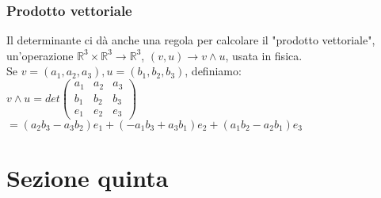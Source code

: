 \documentclass[12pt]{article}
\begin{document}
\subsubsection{Prodotto vettoriale}
Il determinante ci dà anche una regola per calcolare il "prodotto vettoriale", un'operazione
$\mathbb{R}^3\times \mathbb{R}^3 \longrightarrow \mathbb{R}^3$, $(v,u) \longrightarrow v \wedge u $, usata in fisica.\\
Se $v= (a_1, a_2, a_3) , u=(b_1, b_2, b_3)$, definiamo:\\
$v\wedge u = det\begin{pmatrix}
    a_1 & a_2 & a_3\\
    b_1 & b_2 & b_3\\
    e_1 & e_2 & e_3
\end{pmatrix}$
$=(a_2b_3-a_3b_2)e_1 + (-a_1b_3+a_3b_1)e_2 + (a_1b_2-a_2b_1)e_3$

\section{Sezione quinta}
\end{document}
